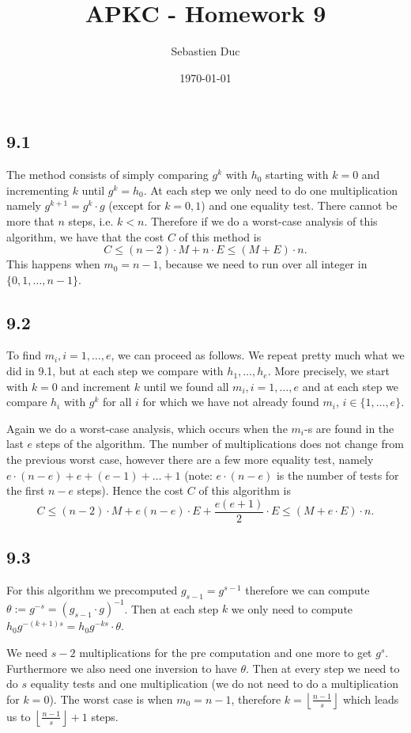 \documentclass[12pt,a4paper]{article}
\title{APKC - Homework 9}
\author{Sebastien Duc}
\date{\today}
\begin{document}
\maketitle

\subsection{9.1}
The method consists of simply comparing $g^k$ with $h_0$ starting with $k=0$ and incrementing $k$ until $g^k = h_0$.
At each step we only need to do one multiplication namely $g^{k+1} = g^k \cdot g$ (except for $k=0,1$) and one equality test.
There cannot be more that $n$ steps, i.e. $k<n$.
Therefore if we do a worst-case analysis of this algorithm, we have that the cost $C$ of this method is 
\[
    C \leq (n-2)\cdot M + n \cdot E \leq (M+E)\cdot n.
\]
This happens when $m_0 = n-1$, because we need to run over all integer in $\{0,1,\dots,n-1\}$.

\subsection{9.2}
To find $m_i, i=1,\dots,e$, we can proceed as follows. We repeat pretty much what we did in 9.1, but at each step we compare with $h_1,\dots,h_e$.
More precisely, we start with $k=0$ and increment $k$ until we found all $m_i,i=1,\dots,e$ and at each step we compare $h_i$ with $g^k$ for all $i$ for which we have not already found $m_i$,
$i\in\{1,\dots,e\}$.

Again we do a worst-case analysis, which occurs when the $m_i$-s are found in the last $e$ steps of the algorithm.
The number of multiplications does not change from the previous worst case, however there are a few more equality test, namely $e\cdot(n-e) + e + (e-1) + \dots + 1$ 
(note: $e\cdot(n-e)$ is the number of tests for the first $n-e$ steps). 
Hence the cost $C$ of this algorithm is 
\[
    C \leq (n-2)\cdot M + e(n-e)\cdot E + \frac{e(e+1)}{2}\cdot E \leq (M + e\cdot E) \cdot n.
\]

\subsection{9.3}
For this algorithm we precomputed $g_{s-1} = g^{s-1}$ therefore we can compute $\theta := g^{-s} = (g_{s-1}\cdot g)^{-1}$.
Then at each step $k$ we only need to compute $h_0g^{-(k+1)s} = h_0g^{-ks}\cdot\theta$.

We need $s-2$ multiplications for the pre computation and one more to get $g^s$. Furthermore we also need one inversion to have $\theta$.
Then at every step we need to do $s$ equality tests and one multiplication (we do not need to do a multiplication for $k=0$).
The worst case is when $m_0 = n-1$, therefore $k=\left\lfloor \frac{n-1}{s} \right\rfloor$ which leads us to $\left\lfloor \frac{n-1}{s}\right\rfloor + 1$ steps.
\end{document}

